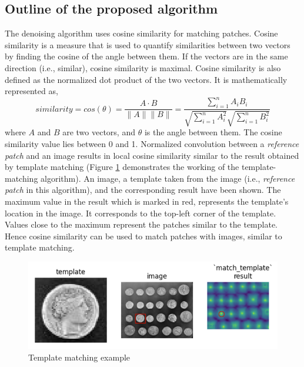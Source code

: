 \documentclass[fleqn,10pt]{wlscirep}
\begin{document}

\subsection*{Outline of the proposed algorithm}
  
The denoising algorithm uses cosine similarity for matching patches. Cosine similarity is a measure that is used to quantify similarities between two vectors \cite{alake_understanding_2021} by finding the cosine of the angle between them. If the vectors are in the same direction (i.e., similar), cosine similarity is maximal. Cosine similarity is also defined as the normalized dot product of the two vectors. It is mathematically represented as,
\begin{equation}
	similarity = cos(\theta) = \frac{A\cdot B}{\|A\|\|B\|} = \frac{\sum_{i=1}^{n}A_i B_i}{\sqrt{\sum_{i=1}^{n}A_i^2}\sqrt{\sum_{i=1}^{n}B_i^2}}
\end{equation}
where $A$ and $B$ are two vectors, and $\theta$ is the angle between them. The cosine similarity value lies between 0 and 1. Normalized convolution between a \textit{reference patch} and an image results in local cosine similarity similar to the result obtained by template matching (Figure \ref{fig:template_matching} demonstrates the working of the template-matching algorithm). An image, a template taken from the image (i.e., \textit{reference patch} in this algorithm), and the corresponding result have been shown. The maximum value in the result which is marked in red, represents the template’s location in the image. It corresponds to the top-left corner of the template. Values close to the maximum represent the patches similar to the template. Hence cosine similarity can be used to match patches with images, similar to template matching. 

\begin{figure}
	\centering
	\includegraphics[scale=0.8]{./imgs/template_matching.png}
	\caption[Template matching example]{Template matching example \footnotemark }
	\label{fig:template_matching}
\end{figure} 
\end{document}
